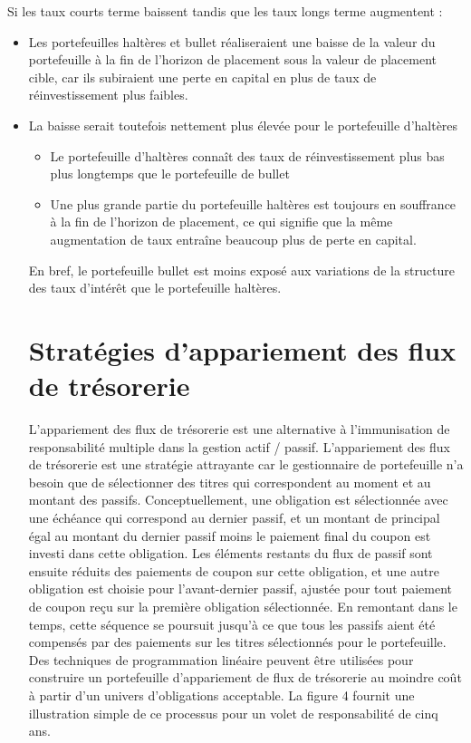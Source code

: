 \documentclass[12pt]{article}
\begin{document}
\vspace{0.5cm}

Si les taux courts terme baissent tandis que les taux longs terme augmentent :
\begin{itemize}
\item Les portefeuilles haltères et bullet réaliseraient une baisse de la valeur du portefeuille à la fin de l'horizon de placement sous la valeur de placement cible, car ils subiraient une perte en capital en plus de taux de réinvestissement plus faibles.
\item La baisse serait toutefois nettement plus élevée pour le portefeuille d'haltères
\begin{itemize}
\item Le portefeuille d'haltères connaît des taux de réinvestissement plus bas plus longtemps que le portefeuille de bullet
\item Une plus grande partie du portefeuille haltères est toujours en souffrance à la fin de l'horizon de placement, ce qui signifie que la même augmentation de taux entraîne beaucoup plus de perte en capital.
\end{itemize}
En bref, le portefeuille bullet est moins exposé aux variations de la structure des taux d'intérêt que le portefeuille haltères.

\section{Stratégies d'appariement des flux de trésorerie}
L'appariement des flux de trésorerie est une alternative à l'immunisation de responsabilité multiple dans la gestion actif / passif. L'appariement des flux de trésorerie est une stratégie attrayante car le gestionnaire de portefeuille n'a besoin que de sélectionner des titres qui correspondent au moment et au montant des passifs. Conceptuellement, une obligation est sélectionnée avec une échéance qui correspond au dernier passif, et un montant de principal égal au montant du dernier passif moins le paiement final du coupon est investi dans cette obligation. Les éléments restants du flux de passif sont ensuite réduits des paiements de coupon sur cette obligation, et une autre obligation est choisie pour l'avant-dernier passif, ajustée pour tout paiement de coupon reçu sur la première obligation sélectionnée. En remontant dans le temps, cette séquence se poursuit jusqu'à ce que tous les passifs aient été compensés par des paiements sur les titres sélectionnés pour le portefeuille. Des techniques de programmation linéaire peuvent être utilisées pour construire un portefeuille d'appariement de flux de trésorerie au moindre coût à partir d'un univers d'obligations acceptable. La figure 4 fournit une illustration simple de ce processus pour un volet de responsabilité de cinq ans.



\end{itemize}
\end{document}
